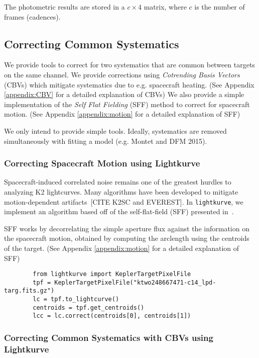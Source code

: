 \documentclass[twocolumn]{aastex62}
\newcommand{\lightkurve}{\texttt{lightkurve}}
\begin{document}
        The photometric results are stored in a $c \times 4$ matrix, where $c$ is the
        number of frames (cadences).

\subsection{Correcting Common Systematics}

    We provide tools to correct for two systematics that are common between targets on the same channel.
    We provide corrections using \emph{Cotrending Basis Vectors} (CBVs) which mitigate systematics due to e.g. spacecraft heating. (See Appendix \ref{appendix:CBV} for a detailed explanation of CBVs)
    We also provide a simple implementation of the \emph{Self Flat Fielding} (SFF) method to correct for spacecraft motion. (See Appendix \ref{appendix:motion} for a detailed explanation of SFF)

    We only intend to provide simple tools.
    Ideally, systematics are removed simultaneously with fitting a model (e.g. Montet and DFM 2015).


    \subsubsection{Correcting Spacecraft Motion using Lightkurve}
        Spacecraft-induced correlated noise remains one of the greatest hurdles to
        analyzing K2 lightcurves. Many algorithms have been developed to mitigate
        motion-dependent artifacts~\cite{vanderburg14}[CITE K2SC and EVEREST].
        In \lightkurve, we implement an algorithm based off of the self-flat-field
        (SFF) presented in~\cite{vanderburg14}.

        SFF works by decorrelating the simple aperture flux
        against the information on the spacecraft motion, obtained by computing the
        arclength using the centroids of the target. (See Appendix \ref{appendix:motion} for a detailed explanation of SFF)

        \begin{verbatim}
        from lightkurve import KeplerTargetPixelFile
        tpf = KeplerTargetPixelFile("ktwo248667471-c14_lpd-targ.fits.gz")
        lc = tpf.to_lightcurve()
        centroids = tpf.get_centroids()
        lcc = lc.correct(centroids[0], centroids[1])
        \end{verbatim}


    \subsubsection{Correcting Common Systematics with CBVs using Lightkurve}
\end{document}
